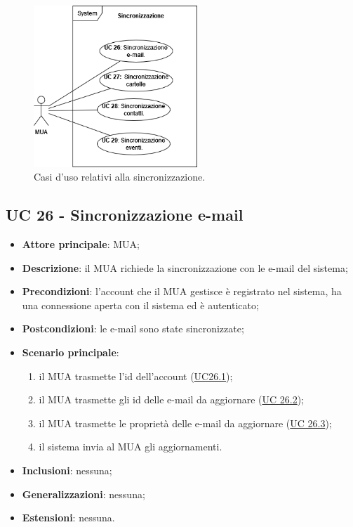 
\begin{figure}[H]
    \includegraphics[width=0.55\textwidth]{sections/uc_imgs/UC-sincronizzazione.png}
    \centering
    \caption{Casi d'uso relativi alla sincronizzazione.}
\end{figure}

\subsection{UC 26 - Sincronizzazione e-mail} \label{sec:UC26}
    
    \begin{itemize}
        \item \textbf{Attore principale}: MUA;
        \item \textbf{Descrizione}: il MUA richiede la sincronizzazione con le e-mail del sistema;
        \item \textbf{Precondizioni}: l’account che il MUA gestisce è registrato nel sistema, ha una connessione aperta con il sistema ed è autenticato;
        \item \textbf{Postcondizioni}: le e-mail sono state sincronizzate;
        \item \textbf{Scenario principale}:
            \begin{enumerate}
                \item il MUA trasmette l'id dell'account (\hyperref[sec:UC26.1]{UC26.1});
                \item il MUA trasmette gli id delle e-mail da aggiornare (\hyperref[sec:UC26.2]{UC 26.2});
                \item il MUA trasmette le proprietà delle e-mail da aggiornare (\hyperref[sec:UC26.3]{UC 26.3});
                \item il sistema invia al MUA gli aggiornamenti.
            \end{enumerate}
        \item \textbf{Inclusioni}: nessuna;
        \item \textbf{Generalizzazioni}: nessuna;
        \item \textbf{Estensioni}: nessuna.
    \end{itemize}

